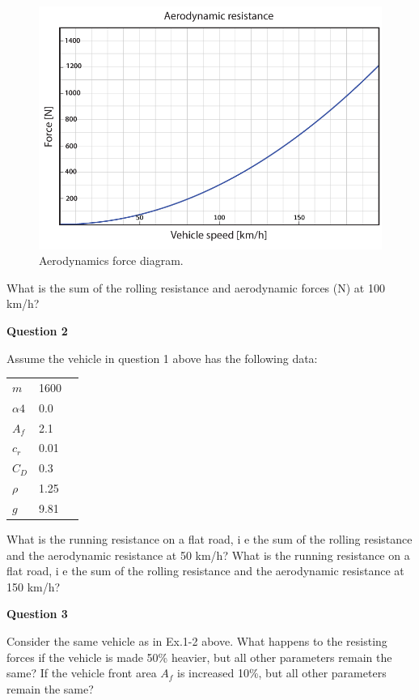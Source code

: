 \begin{figure}[!htb]
\begin{center}
\includegraphics[scale=0.280]{img/model_automotive_sys/Diagram_AerodynamicResistance_01.png}
\end{center}
\caption{Aerodynamics force diagram.}
\label{Diagram_AerodynamicResistance_01}
\end{figure}

What is the sum of the rolling resistance and aerodynamic forces (N) at 100 km/h?


\textbf{Question 2}

Assume the vehicle in question 1 above has the following data:

\begin{tabular}{lll}
\hline
$m$ & 1600\\
$\alpha4$ & 0.0 \\
$A_f$ & 2.1\\
$c_r$ & 0.01\\
$C_D$ & 0.3 \\
$\rho$ & 1.25 \\
$g$ & 9.81 \\
\hline
\end{tabular}

What is the running resistance on a flat road, i e the sum of the rolling resistance and the aerodynamic resistance at 50 km/h? What is the running resistance on a flat road, i e the sum of the rolling resistance and the aerodynamic resistance at 150 km/h?

\textbf{Question 3}

Consider the same vehicle as in Ex.1-2 above. What happens to the resisting forces if the vehicle is made 50\% heavier, but all other parameters remain the same? If the  vehicle front area $A_f$ is increased 10\%, but all other parameters remain the same?







